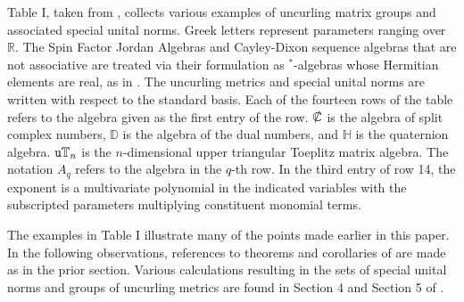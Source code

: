 \documentclass{amsart}
\numberwithin{equation}{section}
\theoremstyle{definition}
\numberwithin{theorem}{section}
\begin{document}
Table I, taken from \cite{fgreensite:2023}, collects various examples of uncurling matrix groups and associated special unital norms.  Greek letters represent parameters ranging over $\mathbb{R}$.  The Spin Factor Jordan Algebras and Cayley-Dixon sequence algebras that are not associative are treated via their formulation as $^*$-algebras whose Hermitian elements are real, as in \cite{fgreensite:2023}. The uncurling metrics and special unital norms are written with respect to the standard basis.  Each of the fourteen rows of the table refers to the algebra given as the first entry of the row.  $\slashed{\mathbb{C}}$ is the algebra of split complex numbers, $\mathbb{D}$ is the algebra of the dual numbers, and $\mathbb{H}$ is the quaternion algebra.  ${\tt u}\mathbb{T}_n$ is the $n$-dimensional upper triangular Toeplitz matrix algebra.  The notation $A_q$ refers to the algebra in the $q$-th row.  In the third entry of row 14, the exponent is a multivariate polynomial in the indicated variables with the subscripted parameters multiplying constituent monomial terms.

 
 The examples in Table I illustrate many of the points made earlier in this paper.  In the following observations, references to theorems and corollaries of \cite{fgreensite:2023} are made as in the prior section.  Various calculations resulting in the sets of special unital norms and groups of uncurling metrics are found in Section 4 and Section 5 of \cite{fgreensite:2023}.
\end{document}
